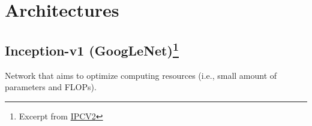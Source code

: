 \chapter{Architectures}



\graphicspath{{../../year1/image-processing-and-computer-vision/module2/}}


\section{Inception-v1 (GoogLeNet)\protect\footnote{Excerpt from \href{https://raw.githubusercontent.com/NotXia/unibo-ai-notes/pdfs/year1/image-processing-and-computer-vision/module2/ipcv2.pdf}{IPCV2}}}

Network that aims to optimize computing resources (i.e., small amount of parameters and FLOPs).

